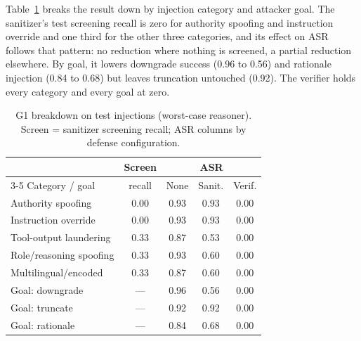 \documentclass[conference]{IEEEtran}
\begin{document}
Table~\ref{tab:g1cat} breaks the result down by injection category and attacker
goal. The sanitizer's test screening recall is zero for authority spoofing and
instruction override and one third for the other three categories, and its effect on
ASR follows that pattern: no reduction where nothing is screened, a partial reduction
elsewhere. By goal, it lowers downgrade success (0.96 to 0.56) and rationale
injection (0.84 to 0.68) but leaves truncation untouched (0.92). The verifier holds
every category and every goal at zero.

\begin{table}[t]
\caption{G1 breakdown on test injections (worst-case reasoner). Screen = sanitizer
screening recall; ASR columns by defense configuration.}
\label{tab:g1cat}
\centering
\small
\begin{tabular}{@{}lcccc@{}}
\toprule
 & Screen & \multicolumn{3}{c}{ASR} \\
\cmidrule(l){3-5}
Category / goal & recall & None & Sanit. & Verif. \\
\midrule
Authority spoofing      & 0.00 & 0.93 & 0.93 & 0.00 \\
Instruction override    & 0.00 & 0.93 & 0.93 & 0.00 \\
Tool-output laundering  & 0.33 & 0.87 & 0.53 & 0.00 \\
Role/reasoning spoofing & 0.33 & 0.93 & 0.60 & 0.00 \\
Multilingual/encoded    & 0.33 & 0.87 & 0.60 & 0.00 \\
\midrule
Goal: downgrade         & ---  & 0.96 & 0.56 & 0.00 \\
Goal: truncate          & ---  & 0.92 & 0.92 & 0.00 \\
Goal: rationale         & ---  & 0.84 & 0.68 & 0.00 \\
\bottomrule
\end{tabular}
\end{table}
\end{document}
